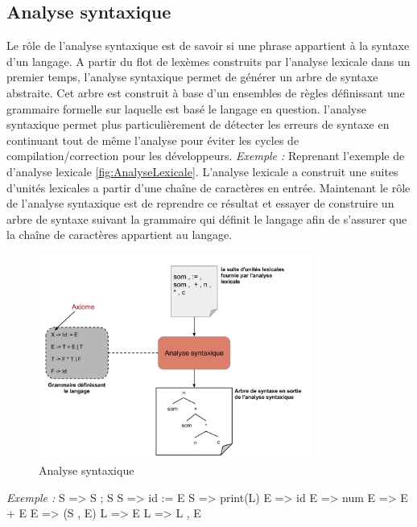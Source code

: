 \documentclass{article}
\begin{document}
\subsection{Analyse syntaxique}\label{sec:analyseurSyntaxique}
Le rôle de l’analyse syntaxique \cite{refAnalyseSyntaxique} est de savoir si une phrase appartient à la syntaxe d’un langage.
A partir du flot de lexèmes construits par l’analyse lexicale dans un premier temps, l’analyse syntaxique permet de générer un arbre de syntaxe abstraite.
Cet arbre est construit à base d’un ensembles de règles définissant une grammaire formelle sur laquelle est basé le langage en question.
l’analyse syntaxique permet plus particulièrement de détecter les erreurs de syntaxe en continuant tout de même l’analyse pour éviter les cycles de compilation/correction pour les développeurs.\newline
\textit{Exemple :}\newline
Reprenant l'exemple de d'analyse lexicale \ref{fig:AnalyseLexicale}. L'analyse lexicale a construit une suites d'unités lexicales a partir d'une chaîne de caractères en entrée.\newline
Maintenant le rôle de l'analyse syntaxique est de reprendre ce résultat et essayer de construire un arbre de syntaxe suivant la grammaire qui définit le langage afin de s'assurer que la chaîne de caractères appartient au langage.

\begin{figure}[h]
	\centering
		\includegraphics[width=0.80\textwidth]{AnalyseSyntaxique.png}
	\caption{Analyse syntaxique}
	\label{fig:AnalyseSyntaxique}
\end{figure}\FloatBarrier
\textit{Exemple :}\cite{refModernCompiler}
\label{ex:ModernCompiler}
\newline\newline
S => S ; S\newline
S => id := E\newline
S => print(L)\newline
E => id\newline
E => num\newline
E => E + E\newline
E => (S , E)\newline
L => E\newline
L => L , E\newline
\end{document}
